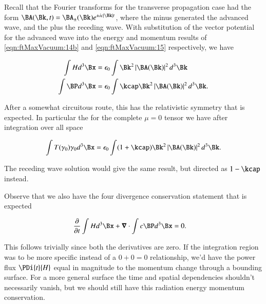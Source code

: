 Recall that the Fourier transforms for the transverse propagation case had the form $\BA(\Bk, t) = \BA_{\pm}(\Bk) e^{\pm i c \Abs{\Bk} t}$, where the minus generated the advanced wave, and the plus the receding wave.  With substitution of the vector potential for the advanced wave into the energy and momentum results of \autoref{eqn:ftMaxVacuum:14b} and \autoref{eqn:ftMaxVacuum:15} respectively, we have

\begin{align}\label{eqn:ftMaxVacuum:80}
\int H d^3 \Bx   &= \epsilon_0 \int \Bk^2 \Abs{\BA(\Bk)}^2 d^3 \Bk \\
\int \BP d^3 \Bx &= \epsilon_0 \int \kcap \Bk^2 \Abs{\BA(\Bk)}^2 d^3 \Bk.
\end{align}

After a somewhat circuitous route, this has the relativistic symmetry that is expected.  In particular the for the complete $\mu=0$ tensor we have after integration over all space

\begin{align}\label{eqn:ftMaxVacuum:81}
\int 
T(\gamma_0) \gamma_0 d^3 \Bx = \epsilon_0 \int (1 + \kcap) \Bk^2 \Abs{\BA(\Bk)}^2 d^3 \Bk.
\end{align}

The receding wave solution would give the same result, but directed as $1 - \kcap$ instead.

Observe that we also have the four divergence conservation statement that is expected

\begin{align}\label{eqn:ftMaxVacuum:82}
\PD{t}{} \int H d^3 \Bx + \spacegrad \cdot \int c \BP d^3 \Bx &= 0.
\end{align}

This follows trivially since both the derivatives are zero.  If the integration region was to be more specific instead of a $0 + 0 = 0$ relationship, we'd have the power flux $\PDi{t}{H}$ equal in magnitude to the momentum change through a bounding surface.  For a more general surface the time and spatial dependencies shouldn't necessarily vanish, but we should still have this radiation energy momentum conservation.


\EndArticle
